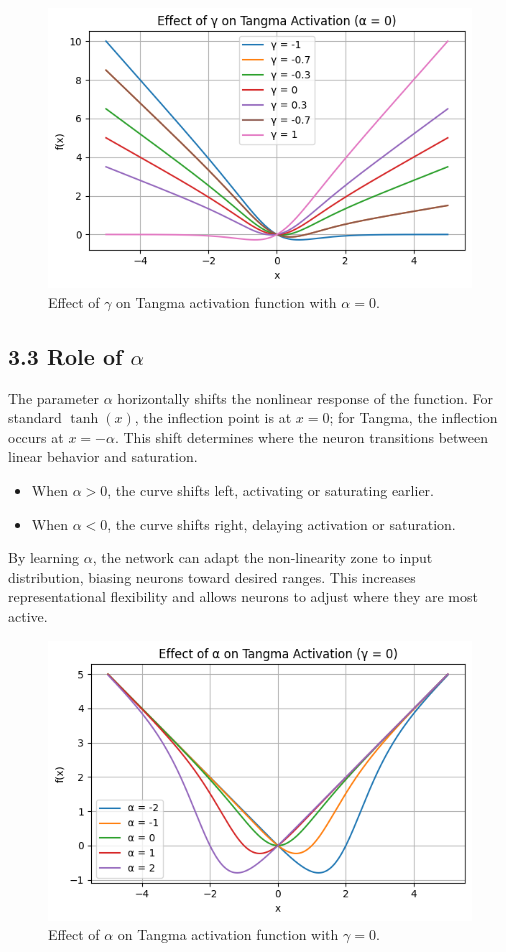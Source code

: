 \documentclass{article}
\begin{document}
\begin{figure}[H]
    \centering
    \includegraphics[width=0.55\linewidth]{gamma_graph.png}
    \caption{Effect of $\gamma$ on Tangma activation function with $\alpha = 0$.}
    \label{fig:gamma-shift}
\end{figure}




\vspace{10pt}
\subsection*{3.3 Role of \(\alpha\)}
The parameter \( \alpha \) horizontally shifts the nonlinear response of the function. For standard \( \tanh(x) \), the inflection point is at \( x = 0 \); for Tangma, the inflection occurs at \( x = -\alpha \). This shift determines where the neuron transitions between linear behavior and saturation.

\begin{itemize}
    \item When \( \alpha > 0 \), the curve shifts left, activating or saturating earlier.
    \item When \( \alpha < 0 \), the curve shifts right, delaying activation or saturation.
\end{itemize}



\noindent
By learning \( \alpha \), the network can adapt the non-linearity zone to input distribution, biasing neurons toward desired ranges. This increases representational flexibility and allows neurons to adjust where they are most active.

\vspace{10pt}




\begin{figure}[H]
    \centering
    \includegraphics[width=0.55\linewidth]{alpha_graph.png}
    \caption{Effect of $\alpha$ on Tangma activation function with $\gamma = 0$.}
    \label{fig:alpha-shift}
\end{figure}
\end{document}
